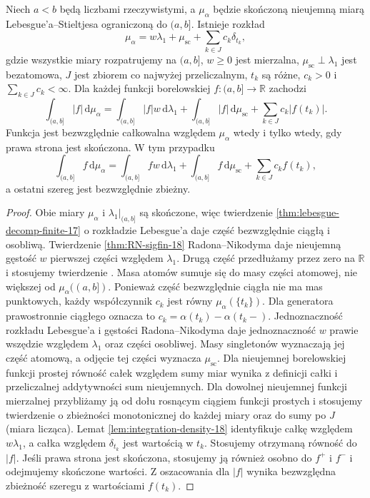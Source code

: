 \begin{twierdzenie}\label{it:thm:stieltjes-decomposition}
Niech $a<b$ będą liczbami rzeczywistymi, a $\mu_\alpha$
będzie skończoną nieujemną miarą Lebesgue'a--Stieltjesa
ograniczoną do $(a,b]$. Istnieje rozkład
\[
\mu_\alpha=w\lambda_1+\mu_{\mathrm{sc}}+\sum_{k\in J}c_k\delta_{t_k},
\]
gdzie wszystkie miary rozpatrujemy na $(a,b]$, $w\ge0$ jest mierzalna, $\mu_{\mathrm{sc}}\perp\lambda_1$ jest bezatomowa, $J$ jest zbiorem co najwyżej przeliczalnym, $t_k$ są różne, $c_k>0$ i $\sum_{k\in J}c_k<\infty$. Dla każdej funkcji borelowskiej $f:(a,b]\to\mathbb{R}$ zachodzi
\[
\int_{(a,b]}|f|\,\mathrm d\mu_\alpha
=\int_{(a,b]}|f|w\,\mathrm d\lambda_1+
\int_{(a,b]}|f|\,\mathrm d\mu_{\mathrm{sc}}+
\sum_{k\in J}c_k|f(t_k)|.
\]
Funkcja jest bezwzględnie całkowalna względem $\mu_\alpha$ wtedy i tylko wtedy, gdy prawa strona jest skończona. W tym przypadku
\[
 \int_{(a,b]}f\,\mathrm d\mu_\alpha
 =\int_{(a,b]}fw\,\mathrm d\lambda_1+
 \int_{(a,b]}f\,\mathrm d\mu_{\mathrm{sc}}+
 \sum_{k\in J}c_k f(t_k),
\]
a ostatni szereg jest bezwzględnie zbieżny.
\end{twierdzenie}
\begin{proof}
Obie miary $\mu_\alpha$ i $\lambda_1|_{(a,b]}$ są skończone,
więc twierdzenie \ref{thm:lebesgue-decomp-finite-17} o rozkładzie
Lebesgue'a daje część bezwzględnie ciągłą i osobliwą. Twierdzenie \ref{thm:RN-sigfin-18} Radona--Nikodyma daje nieujemną gęstość $w$ pierwszej części względem $\lambda_1$. Drugą część przedłużamy przez zero na $\mathbb{R}$ i stosujemy twierdzenie . Masa atomów sumuje się do masy części atomowej, nie większej od $\mu_\alpha((a,b])$.
Ponieważ część bezwzględnie ciągła nie ma mas punktowych,
każdy współczynnik $c_k$ jest równy
$\mu_\alpha(\{t_k\})$. Dla generatora prawostronnie
ciągłego oznacza to $c_k=\alpha(t_k)-\alpha(t_k-)$.
Jednoznaczność rozkładu Lebesgue'a i gęstości
Radona--Nikodyma daje jednoznaczność $w$ prawie wszędzie
względem $\lambda_1$ oraz części osobliwej.
Masy singletonów wyznaczają jej część atomową,
a odjęcie tej części wyznacza $\mu_{\mathrm{sc}}$.
Dla nieujemnej borelowskiej funkcji prostej równość całek względem sumy miar wynika z definicji całki i przeliczalnej addytywności sum nieujemnych. Dla dowolnej nieujemnej funkcji mierzalnej przybliżamy ją od dołu rosnącym ciągiem funkcji prostych i stosujemy twierdzenie  o zbieżności monotonicznej do każdej miary oraz do sumy po $J$ (miara licząca). Lemat \ref{lem:integration-density-18} identyfikuje całkę względem $w\lambda_1$, a całka względem $\delta_{t_k}$ jest wartością w $t_k$. Stosujemy otrzymaną równość do $|f|$. Jeśli prawa strona jest skończona, stosujemy ją również osobno do $f^+$ i $f^-$ i odejmujemy skończone wartości. Z oszacowania dla $|f|$ wynika bezwzględna zbieżność szeregu z wartościami $f(t_k)$.
\end{proof}

